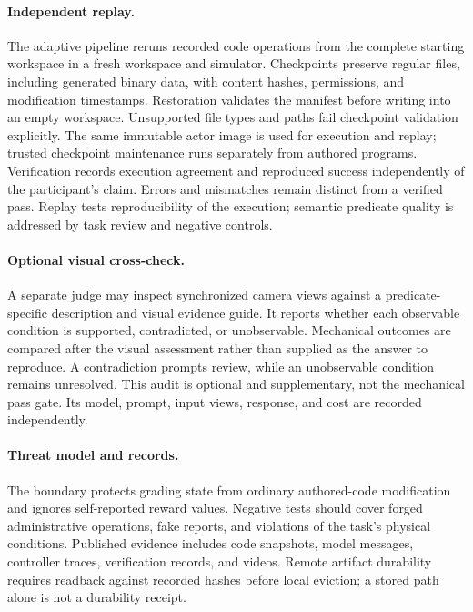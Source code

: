\documentclass[11pt]{article}
\begin{document}
\paragraph{Independent replay.}
The adaptive pipeline reruns recorded code operations from the complete starting workspace in a fresh workspace and simulator. Checkpoints preserve regular files, including generated binary data, with content hashes, permissions, and modification timestamps. Restoration validates the manifest before writing into an empty workspace. Unsupported file types and paths fail checkpoint validation explicitly. The same immutable actor image is used for execution and replay; trusted checkpoint maintenance runs separately from authored programs. Verification records execution agreement and reproduced success independently of the participant's claim. Errors and mismatches remain distinct from a verified pass. Replay tests reproducibility of the execution; semantic predicate quality is addressed by task review and negative controls.

\paragraph{Optional visual cross-check.}
A separate judge may inspect synchronized camera views against a predicate-specific description and visual evidence guide. It reports whether each observable condition is supported, contradicted, or unobservable. Mechanical outcomes are compared after the visual assessment rather than supplied as the answer to reproduce. A contradiction prompts review, while an unobservable condition remains unresolved. This audit is optional and supplementary, not the mechanical pass gate. Its model, prompt, input views, response, and cost are recorded independently.

\paragraph{Threat model and records.}
The boundary protects grading state from ordinary authored-code modification and ignores self-reported reward values. Negative tests should cover forged administrative operations, fake reports, and violations of the task's physical conditions. Published evidence includes code snapshots, model messages, controller traces, verification records, and videos. Remote artifact durability requires readback against recorded hashes before local eviction; a stored path alone is not a durability receipt.
\end{document}
